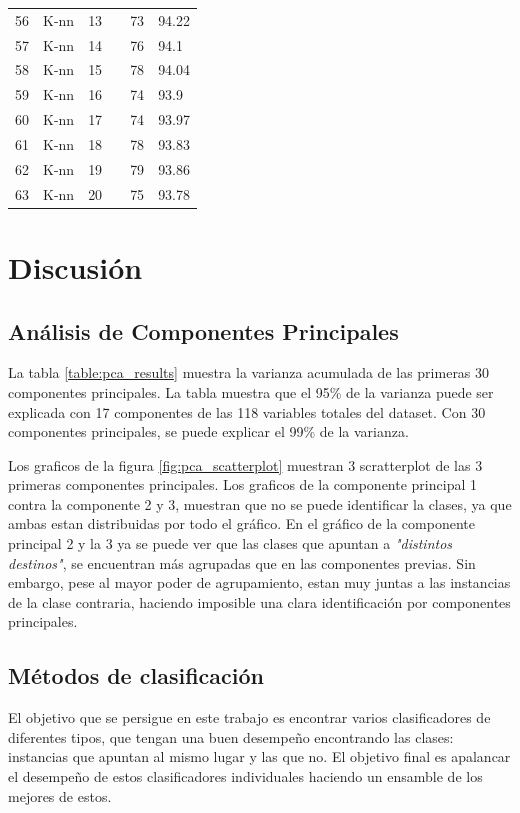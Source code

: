 \documentclass[journal]{IEEEtran}
\begin{document}
\begin{table}[!hb]
\begin{tabular}{l | l l l | l l}
	56	&	K-nn	&	13	&		&	73	&	94.22 \\
	57	&	K-nn	&	14	&		&	76	&	94.1 \\
	58	&	K-nn	&	15	&		&	78	&	94.04 \\
	59	&	K-nn	&	16	&		&	74	&	93.9 \\
	60	&	K-nn	&	17	&		&	74	&	93.97 \\
	61	&	K-nn	&	18	&		&	78	&	93.83 \\
	62	&	K-nn	&	19	&		&	79	&	93.86 \\
	63	&	K-nn	&	20	&		&	75	&	93.78 \\
\end{tabular}
\end{table}


\section{Discusión}
\subsection{Análisis de Componentes Principales}
La tabla \ref{table:pca_results} muestra la varianza acumulada de las
primeras 30 componentes principales. La tabla muestra que el 95\%
de la varianza puede ser explicada con 17 componentes de las 118 variables
totales del dataset. Con 30 componentes principales, se puede explicar
el 99\% de la varianza.

Los graficos de la figura \ref{fig:pca_scatterplot} muestran 3 scratterplot de
las 3 primeras componentes principales. Los graficos de la componente principal 1 
contra la componente 2 y 3, muestran que no se puede identificar la clases, ya
que ambas estan distribuidas por todo el gráfico. En el gráfico de la
componente principal 2 y la 3 ya se puede ver que las clases que apuntan
a \textit{"distintos destinos"}, se encuentran más agrupadas que en las componentes
previas. Sin embargo, pese al mayor poder de agrupamiento, estan muy juntas a
las instancias de la clase contraria, haciendo imposible una clara identificación por
componentes principales.

\subsection{Métodos de clasificación}
El objetivo que se persigue en este trabajo es encontrar varios clasificadores
de diferentes tipos, que tengan una buen desempeño encontrando las clases:
instancias que apuntan al mismo lugar y las que no. El objetivo final es apalancar
el desempeño de estos clasificadores individuales haciendo un ensamble
de los mejores de estos. 
\end{document}
